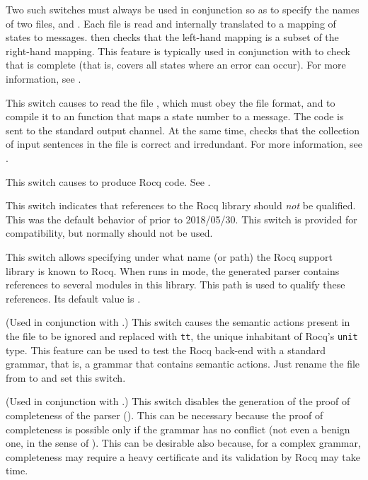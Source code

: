 \documentclass[onecolumn,11pt,nocopyrightspace,preprint]{sigplanconf}
\begin{document}
 Two
such switches must always be used in conjunction so as to specify the names of
two \messages files,  and . Each file is read and
internally translated to a mapping of states to messages. \menhir then checks
that the left-hand mapping is a subset of the right-hand mapping. This feature
is typically used in conjunction with \olisterrors to check that 
is complete (that is, covers all states where an error can occur).
For more information, see .

 This switch causes \menhir to read the
file , which must obey the \messages file format, and to compile
it to an \ocaml function that maps a state number to a message. The \ocaml code
is sent to the standard output channel. At the same time, \menhir checks that
the collection of input sentences in the file  is correct and
irredundant. For more information, see .

\docswitch{\orocq} This switch causes \menhir to produce Rocq code. See .

\docswitch{\orocqlibnopath} This switch indicates that references to the Rocq
library \rocqmenhirlib should \emph{not} be qualified. This was the default
behavior of \menhir prior to 2018/05/30. This switch is provided for
compatibility, but normally should not be used.

 This switch allows specifying under what
name (or path) the Rocq support library is known to Rocq. When \menhir runs in
\orocq mode, the generated parser contains references to several modules in
this library. This path is used to qualify these references. Its default value
is \rocqmenhirlib.

\docswitch{\orocqnoactions} (Used in conjunction with \orocq.) This switch
causes the semantic actions present in the \vy file to be ignored and
replaced with \verb+tt+, the unique inhabitant of Rocq's \verb+unit+ type. This
feature can be used to test the Rocq back-end with a standard grammar, that is, a
grammar that contains \ocaml semantic actions. Just rename the file from
\mly to \vy and set this switch.

\docswitch{\orocqnocomplete} (Used in conjunction with \orocq.) This switch
disables the generation of the proof of completeness of the parser
(). This can be necessary because the proof of completeness is
possible only if the grammar has no conflict (not even a benign one, in the
sense of ). This can be desirable also because, for
a complex grammar, completeness may require a heavy certificate and its
validation by Rocq may take time.
\end{document}
